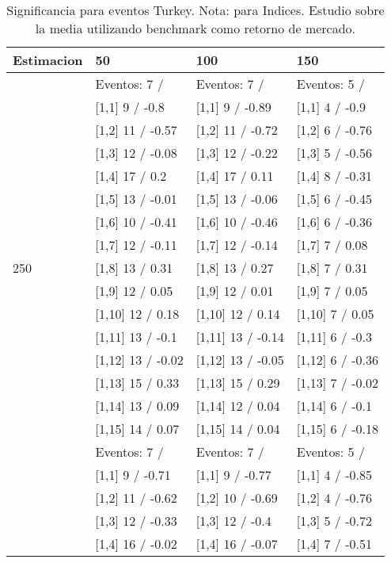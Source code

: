 \begin{table}

\caption{Significancia para eventos Turkey. Nota: para Indices. Estudio sobre la media utilizando benchmark como retorno de mercado.}
\centering
\begin{tabular}[t]{llll}
\toprule
Estimacion & 50 & 100 & 150\\
\midrule
 & Eventos:  7 / & Eventos:  7 / & Eventos:  5 /\\
 & {}[1,1] 9  / -0.8 & {}[1,1] 9  / -0.89 & {}[1,1] 4  / -0.9\\
 & {}[1,2] 11  / -0.57 & {}[1,2] 11  / -0.72 & {}[1,2] 6  / -0.76\\
 & {}[1,3] 12  / -0.08 & {}[1,3] 12  / -0.22 & {}[1,3] 5  / -0.56\\
 & {}[1,4] 17  / 0.2 & {}[1,4] 17  / 0.11 & {}[1,4] 8  / -0.31\\
\addlinespace
 & {}[1,5] 13  / -0.01 & {}[1,5] 13  / -0.06 & {}[1,5] 6  / -0.45\\
 & {}[1,6] 10  / -0.41 & {}[1,6] 10  / -0.46 & {}[1,6] 6  / -0.36\\
 & {}[1,7] 12  / -0.11 & {}[1,7] 12  / -0.14 & {}[1,7] 7  / 0.08\\
250 & {}[1,8] 13  / 0.31 & {}[1,8] 13  / 0.27 & {}[1,8] 7  / 0.31\\
 & {}[1,9] 12  / 0.05 & {}[1,9] 12  / 0.01 & {}[1,9] 7  / 0.05\\
\addlinespace
 & {}[1,10] 12  / 0.18 & {}[1,10] 12  / 0.14 & {}[1,10] 7  / 0.05\\
 & {}[1,11] 13  / -0.1 & {}[1,11] 13  / -0.14 & {}[1,11] 6  / -0.3\\
 & {}[1,12] 13  / -0.02 & {}[1,12] 13  / -0.05 & {}[1,12] 6  / -0.36\\
 & {}[1,13] 15  / 0.33 & {}[1,13] 15  / 0.29 & {}[1,13] 7  / -0.02\\
 & {}[1,14] 13  / 0.09 & {}[1,14] 12  / 0.04 & {}[1,14] 6  / -0.1\\
\addlinespace
 & {}[1,15] 14  / 0.07 & {}[1,15] 14  / 0.04 & {}[1,15] 6  / -0.18\\
 & Eventos:  7 / & Eventos:  7 / & Eventos:  5 /\\
 & {}[1,1] 9  / -0.71 & {}[1,1] 9  / -0.77 & {}[1,1] 4  / -0.85\\
 & {}[1,2] 11  / -0.62 & {}[1,2] 10  / -0.69 & {}[1,2] 4  / -0.76\\
 & {}[1,3] 12  / -0.33 & {}[1,3] 12  / -0.4 & {}[1,3] 5  / -0.72\\
\addlinespace
 & {}[1,4] 16  / -0.02 & {}[1,4] 16  / -0.07 & {}[1,4] 7  / -0.51\\

\end{tabular}
\end{table}
